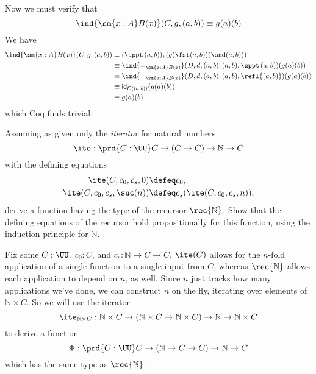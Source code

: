 Now we must verify that
\[
  \ind{\sm{x:A}B(x)}(C, g, (a, b)) \equiv g(a)(b)
\]
We have
\begin{align*}
  \ind{\sm{x:A}B(x)}(C, g, (a, b))
  &\equiv
  (\uppt\, (a, b))_{*}(g(\fst(a, b))(\snd(a, b)))
  \\&\equiv
  \ind{=_{\sm{x:A}B(x)}}(D, d, (a, b), (a, b), \uppt\, (a, b))
  (g(a)(b))
  \\&\equiv
  \ind{=_{\sm{x:A}B(x)}}(D, d, (a, b), (a, b), \refl{(a, b)})
  (g(a)(b))
  \\&\equiv
  \mathsf{id}_{C((a, b))}
  (g(a)(b))
  \\&\equiv
  g(a)(b)
\end{align*}
which Coq finds trivial:


  Assuming as given only the \emph{iterator} for natural numbers
\[
  \ite : 
  \prd{C:\UU} C \to (C \to C) \to \mathbb{N} \to C
\]                                                        
with the defining equations
\begin{align*}
  \ite(C, c_{0}, c_{s}, 0) &\defeq c_{0}, \\
  \ite(C, c_{0}, c_{s}, \suc(n)) &\defeq c_{s}(\ite(C, c_{0}, c_{s}, n)),
\end{align*}
derive a function having the type of the recursor $\rec{\mathbb{N}}$.  Show
that the defining equations of the recursor hold propositionally for this
function, using the induction principle for $\mathbb{N}$.

\soln  Fix some $C :
\UU$, $c_{0} : C$, and $c_{s} : \mathbb{N} \to C \to C$.
$\ite(C)$ allows for the $n$-fold application of a single function to a single
input from $C$, whereas $\rec{\mathbb{N}}$ allows each application to
depend on $n$, as well.  Since $n$ just tracks how many applications we've
done, we can construct $n$ on the fly, iterating over elements of $\mathbb{N}
\times C$.  So we will use the iterator
\[
  \ite_{\mathbb{N} \times C} : \mathbb{N} \times C \to (\mathbb{N} \times C
  \to \mathbb{N} \times C) \to \mathbb{N} \to \mathbb{N} \times C
\]
to derive a function
\[
  \Phi : \prd{C : \UU} C \to (\mathbb{N} \to C \to C) \to
  \mathbb{N} \to C
\]
which has the same type as $\rec{\mathbb{N}}$.  

